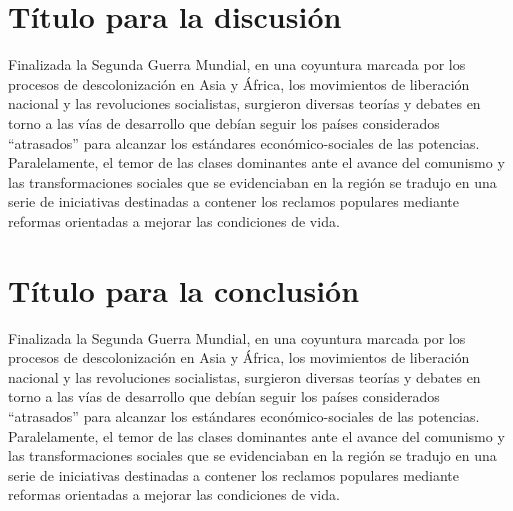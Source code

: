 \documentclass{article}
\begin{document}
\section{Título para la discusión}
Finalizada la Segunda Guerra Mundial, en una coyuntura marcada por los procesos de descolonización en Asia y África, los movimientos de liberación nacional y las revoluciones socialistas, surgieron diversas teorías y debates en torno a las vías de desarrollo que debían seguir los países considerados “atrasados” para alcanzar los estándares económico-sociales de las potencias. Paralelamente, el temor de las clases dominantes ante el avance del comunismo y las transformaciones sociales que se evidenciaban en la región se tradujo en una serie de iniciativas destinadas a contener los reclamos populares mediante reformas orientadas a mejorar las condiciones de vida.


\section{Título para la conclusión}
Finalizada la Segunda Guerra Mundial, en una coyuntura marcada por los procesos de descolonización en Asia y África, los movimientos de liberación nacional y las revoluciones socialistas, surgieron diversas teorías y debates en torno a las vías de desarrollo que debían seguir los países considerados “atrasados” para alcanzar los estándares económico-sociales de las potencias. Paralelamente, el temor de las clases dominantes ante el avance del comunismo y las transformaciones sociales que se evidenciaban en la región se tradujo en una serie de iniciativas destinadas a contener los reclamos populares mediante reformas orientadas a mejorar las condiciones de vida.



\printbibliography
\end{document}
